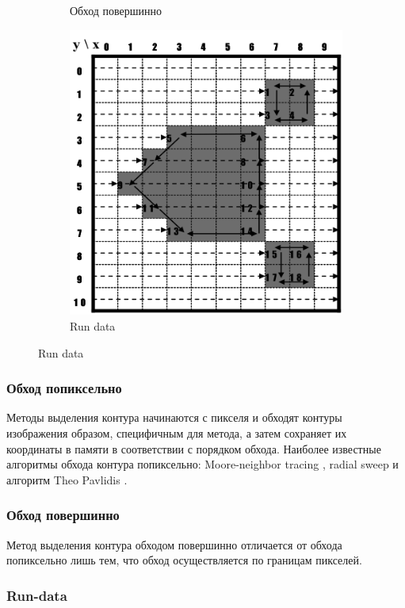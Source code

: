 \documentclass{fefu_thesis/cls/fefu}
\begin{document}
\begin{figure}[H]
\begin{subfigure}[t]{0.32\linewidth}
            \caption{Обход повершинно}
        \end{subfigure}
        \begin{subfigure}[t]{0.32\linewidth}
            \centering
            \includegraphics[scale=0.36]{images/run_data_algorithm.png}
            \caption{Run data}
        \end{subfigure}
    \end{figure}

    \subsubsection{Обход попиксельно}

    Методы выделения контура начинаются с пикселя и обходят контуры изображения образом, специфичным для метода, а затем сохраняет их координаты в памяти в соответствии с порядком обхода. Наиболее известные алгоритмы обхода контура попиксельно: Moore-neighbor tracing \cite{MoorNeighbor}, radial sweep \cite{RadialSweep} и алгоритм Theo Pavlidis \cite{TheoPavlidis}.

    \subsubsection{Обход повершинно}

    Метод выделения контура обходом повершинно отличается от обхода попиксельно лишь тем, что обход осуществляется по границам пикселей.

    \subsubsection{Run-data}
\end{document}
